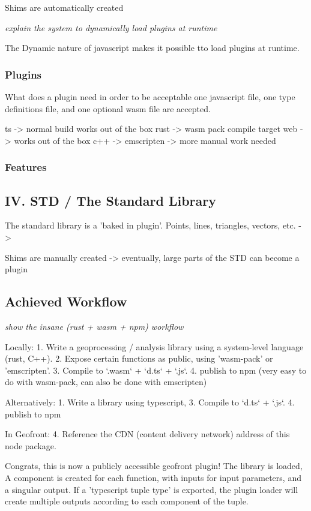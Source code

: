 Shims are automatically created

\emph{explain the system to dynamically load plugins at runtime}

The Dynamic nature of javascript makes it possible tto load plugins at runtime. 

  

\subsubsection{Plugins}
What does a plugin need in order to be acceptable
one javascript file, one type definitions file, and one optional wasm file are accepted. 

ts -> normal build works out of the box
rust -> wasm pack compile target web -> works out of the box 
c++ -> emscripten -> more manual work needed 

\subsubsection{Features}



\subsection{IV. STD / The Standard Library}

The standard library is a 'baked in plugin'.
Points, lines, triangles, vectors, etc.
-> 

Shims are manually created
-> eventually, large parts of the STD can become a plugin


\subsection{Achieved Workflow}
\emph{show the insane (rust + wasm + npm) workflow}

Locally: 
1. Write a geoprocessing / analysis library using a system-level language (rust, C++).
2. Expose certain functions as public, using 'wasm-pack' or 'emscripten'.
3. Compile to `.wasm` + `d.ts` + `.js`.
4. publish to npm (very easy to do with wasm-pack, can also be done with emscripten)

Alternatively: 
1. Write a library using typescript, 
3. Compile to `d.ts` + `.js`.
4. publish to npm 

In Geofront: 
4. Reference the CDN (content delivery network) address of this node package. 


Congrats, this is now a publicly accessible geofront plugin!
The library is loaded, A component is created for each function, with inputs for input parameters, and a singular output. If a 'typescript tuple type' is exported, the plugin loader will create multiple outputs according to each component of the tuple.

